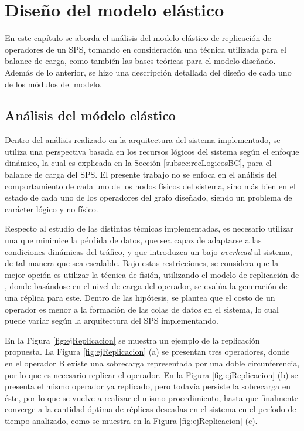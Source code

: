 \chapter{Dise\~no del modelo elástico}
\label{cap:disenoSistema}

En este capítulo se aborda el análisis del modelo elástico de replicación de operadores de un SPS, tomando en consideración una técnica utilizada para el balance de carga, como también las bases teóricas para el modelo diseñado. Además de lo anterior, se hizo una descripción detallada del diseño de cada uno de los módulos del modelo.

\section{Análisis del módelo elástico}
Dentro del análisis realizado en la arquitectura del sistema implementado, se utiliza una perspectiva basada en los recursos lógicos del sistema según el enfoque dinámico, la cual es explicada en la Sección \ref{subsec:recLogicosBC}, para el balance de carga del SPS. El presente trabajo no se enfoca en el análisis del comportamiento de cada uno de los nodos físicos del sistema, sino más bien en el estado de cada uno de los operadores del grafo diseñado, siendo un problema de carácter lógico y no físico.

Respecto al estudio de las distintas técnicas implementadas, es necesario utilizar una que minimice la pérdida de datos, que sea capaz de adaptarse a las condiciones dinámicas del tráfico, y que introduzca un bajo \textit{overhead} al sistema, de tal manera que sea escalable. Bajo estas restricciones, se considera que la mejor opción es utilizar la técnica de fisión, utilizando el modelo de replicación de \citep{FernandezMKP13}, donde basándose en el nivel de carga del operador, se evalúa la generación de una réplica para este. Dentro de las hipótesis, se plantea que el costo de un operador es menor a la formación de las colas de datos en el sistema, lo cual puede variar según la arquitectura del SPS implementando.

En la Figura \ref{fig:ejReplicacion} se muestra un ejemplo de la replicación propuesta. La Figura \ref{fig:ejReplicacion} (a) se presentan tres operadores, donde en el operador B existe una sobrecarga representada por una doble circunferencia, por lo que es necesario replicar el operador. En la Figura \ref{fig:ejReplicacion} (b) se presenta el mismo operador ya replicado, pero todavía persiste la sobrecarga en éste, por lo que se vuelve a realizar el mismo procedimiento, hasta que finalmente converge a la cantidad óptima de réplicas deseadas en el sistema en el período de tiempo analizado, como se muestra en la Figura \ref{fig:ejReplicacion} (c).


